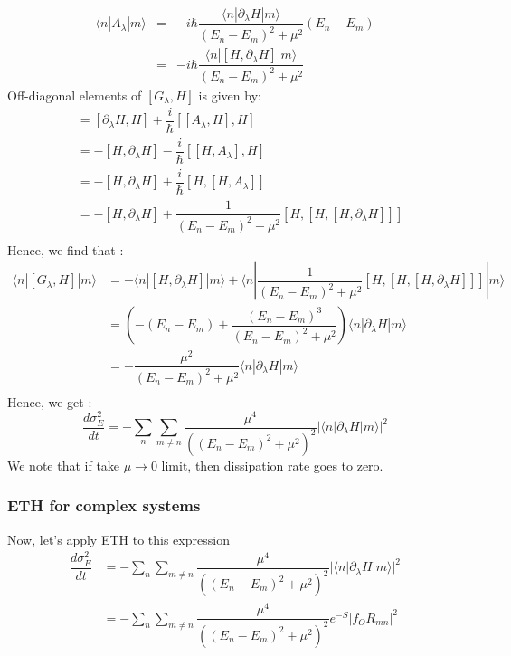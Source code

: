 \documentclass[11pt,a4paper]{article}
\begin{document}
\begin{eqnarray}
\langle n | A_{\lambda} | m \rangle &=&  -i \hbar \dfrac{\langle n | \partial_{\lambda}H  | m \rangle}{(E_n-E_m)^2 + \mu^2} (E_n-E_m) \\
&=&  -i \hbar \dfrac{\langle n | [H, \partial_{\lambda} H]  | m \rangle}{(E_n-E_m)^2 + \mu^2} 
\end{eqnarray}
Off-diagonal elements of $[G_{\lambda}, H]$ is given by:
\begin{align}
 [G_{\lambda}, H] &= [\partial_{\lambda} H,H] + \dfrac{i}{\hbar} [[A_{\lambda} , H],H] \\
  &= -[H,\partial_{\lambda} H] - \dfrac{i}{\hbar} [[H,A_{\lambda}],H] \\
    &= -[H,\partial_{\lambda} H] + \dfrac{i}{\hbar} [H,[H,A_{\lambda}]] \\
 &=  -[H,\partial_{\lambda} H] + \dfrac{1}{(E_n-E_m)^2 + \mu^2}  [H,[H, [H, \partial_{\lambda} H]]] \\
 \end{align}
Hence, we find that :
\begin{align*}
\langle n |  [G_{\lambda}, H]|  m \rangle  &=  - \langle n |[H,\partial_{\lambda} H] |m \rangle +\langle n| \dfrac{1}{(E_n-E_m)^2 + \mu^2}  [H,[H, [H, \partial_{\lambda} H]]] | m\rangle \\
 &=  \left(-(E_n- E_m) + \dfrac{(E_n- E_m)^3}{(E_n-E_m)^2 + \mu^2} \right)  \langle n |\partial_{\lambda} H |m \rangle \\
 &=  -\dfrac{\mu^2}{(E_n-E_m)^2 + \mu^2}  \langle n |\partial_{\lambda} H |m \rangle \\
\end{align*}
Hence, we get :
\begin{equation}
\boxed{
\dfrac{d \sigma^2_E}{dt} =  - \sum_{ n} \sum_{m \neq n}\dfrac{\mu^4}{((E_n-E_m)^2 + \mu^2)^2}  |\langle n |\partial_{\lambda} H |m \rangle|^2}
\end{equation}
We note that if take $\mu \rightarrow 0$ limit, then dissipation rate goes to zero.



\subsubsection{ETH for complex systems}



Now, let's apply ETH to this expression 
\begin{align}
\dfrac{d \sigma^2_E}{dt} &=  - \sum_{ n} \sum_{m \neq n}\dfrac{\mu^4}{((E_n-E_m)^2 + \mu^2)^2}  |\langle n |\partial_{\lambda} H |m \rangle|^2 \\
&=  - \sum_{ n} \sum_{m \neq n}\dfrac{\mu^4}{((E_n-E_m)^2 + \mu^2)^2}  e^{-S} |f_{O} R_{mn}|^2
\end{align}
\end{document}
